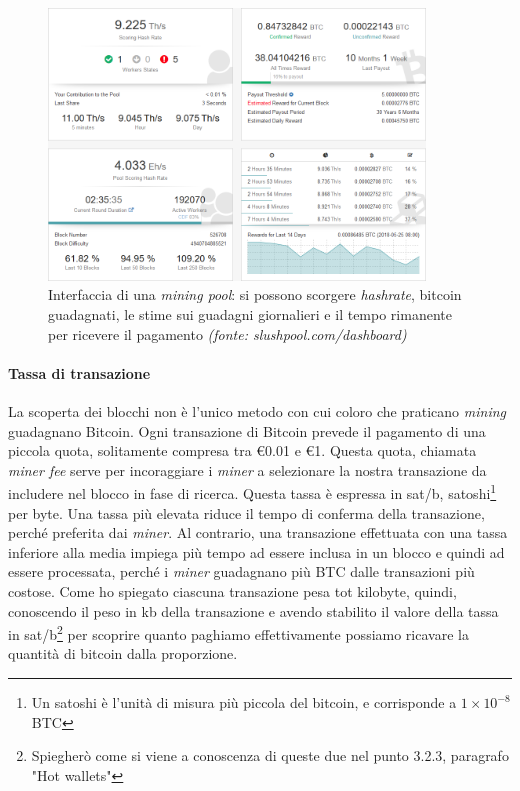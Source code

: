 \documentclass {article}
\begin{document}
\vspace {0.5cm}
\begin{figure}[htb!]
\includegraphics [width = 10cm] {dashboard.png}
\centering
\caption {Interfaccia di una \textit{mining pool}: si possono scorgere \textit{hashrate}, bitcoin guadagnati, le stime sui guadagni giornalieri e il tempo rimanente per ricevere il pagamento \textit{(fonte: slushpool.com/dashboard)}}
\end{figure}
\vspace {0.2cm}

\paragraph {Tassa di transazione}

La scoperta dei blocchi non è l'unico metodo con cui coloro che praticano \textit{mining} guadagnano Bitcoin.
Ogni transazione di Bitcoin prevede il pagamento di una piccola quota, solitamente compresa tra \euro{0.01} e \euro{1}.
Questa quota, chiamata \textit{miner fee} serve per incoraggiare i \textit{miner} a selezionare la nostra transazione da includere nel blocco in fase di ricerca.
Questa tassa è espressa in sat/b, satoshi\footnote{Un satoshi è l'unità di misura più piccola del bitcoin, e corrisponde a $1 \times 10^{-8}$ BTC} per byte.
Una tassa più elevata riduce il tempo di conferma della transazione, perché preferita dai \textit{miner}. Al contrario, una transazione effettuata con una tassa inferiore alla media impiega più tempo ad essere inclusa in un blocco e quindi ad essere processata, perché i \textit{miner} guadagnano più BTC dalle transazioni più costose.
Come ho spiegato ciascuna transazione pesa tot kilobyte, quindi, conoscendo il peso in kb della transazione e avendo stabilito il valore della tassa in sat/b\footnote{Spiegherò come si viene a conoscenza di queste due nel punto 3.2.3, paragrafo "Hot wallets"} per scoprire quanto paghiamo effettivamente possiamo ricavare la quantità di bitcoin dalla proporzione.
\end{document}
